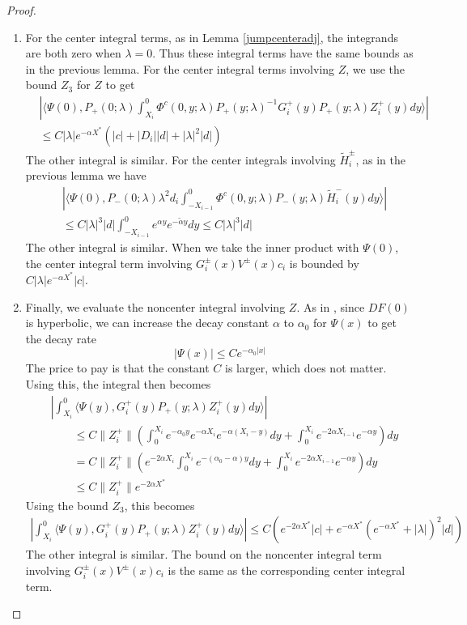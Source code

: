 \documentclass[thesis.tex]{subfiles}
\begin{document}
\begin{lemma}
\begin{proof}
\begin{enumerate}
\item For the center integral terms, as in Lemma \ref{jumpcenteradj}, the integrands are both zero when $\lambda = 0$. Thus these integral terms have the same bounds as in the previous lemma. For the center integral terms involving $Z$, we use the bound $Z_3$ for $Z$ to get
\begin{align*}
&\left| \langle \Psi(0), P_+(0; \lambda) \int_{X_i}^0 \Phi^c(0, y; \lambda) P_+(y; \lambda)^{-1} G_i^+(y) P_+(y; \lambda) Z_i^+(y) dy \rangle \right| \\
&\leq C |\lambda| e^{-\alpha X^*}\left(|c| + |D_i||d| + |\lambda|^2|d|\right)
\end{align*}
The other integral is similar. For the center integrals involving $\tilde{H}_i^\pm$, as in the previous lemma we have
\begin{align*}
&\left| \langle \Psi(0), P_-(0; \lambda) \lambda^2 d_i \int_{-X_{i-1}}^0 \Phi^c(0, y; \lambda) P_-(y; \lambda) \tilde{H}_i^-(y) dy \rangle \right| \\
&\leq C |\lambda|^3 |d| \int_{-X_{i-1}}^0 e^{\alpha y} e^{-\tilde{\alpha} y} dy \leq C |\lambda|^3 |d| 
\end{align*}
The other integral is similar. When we take the inner product with $\Psi(0)$, the center integral term involving $G_i^\pm(x) V^\pm(x) c_i$ is bounded by $C|\lambda|e^{-\alpha X^*}|c|$. 

\item Finally, we evaluate the noncenter integral involving $Z$. As in \cite[p. 448]{Sandstede1998}, since $DF(0)$ is hyperbolic, we can increase the decay constant $\alpha$ to $\alpha_0$ for $\Psi(x)$ to get the decay rate
\[
|\Psi(x)| \leq C e^{-\alpha_0 |x|}
\]
The price to pay is that the constant $C$ is larger, which does not matter. Using this, the integral then becomes
\begin{align*}
&\left| \int_{X_i}^0 \langle \Psi(y), G_i^+(y) P_+(y; \lambda) Z_i^+(y) dy \rangle \right| \\
&\qquad \leq C \| Z_i^+\|  \left( \int_0^{X_i} e^{-\alpha_0 y} e^{-\alpha X_i} e^{-\alpha(X_i - y)} dy + \int_0^{X_i} e^{-2 \alpha X_{i-1}} e^{-\alpha y} \right) dy \\
&\qquad =C \| Z_i^+\|  \left( e^{-2 \alpha X_i} \int_0^{X_i} e^{-(\alpha_0 - \alpha) y} dy + \int_0^{X_i} e^{-2 \alpha X_{i-1}} e^{-\alpha y} \right) dy \\
&\qquad \leq C \| Z_i^+\| e^{-2 \alpha X^*}
\end{align*}
Using the bound $Z_3$, this becomes
\begin{align*}
\left| \int_{X_i}^0 \langle \Psi(y), G_i^+(y) P_+(y; \lambda) Z_i^+(y) dy \rangle \right|\leq C \left( e^{-2 \alpha X^* } |c| + e^{-\alpha X^* }(e^{-\alpha X^*} + |\lambda|)^2 |d| \right)
\end{align*}
The other integral is similar. The bound on the noncenter integral term involving $G_i^\pm(x) V^\pm(x) c_i$ is the same as the corresponding center integral term.
\end{enumerate}


\end{proof}
\end{lemma}
\end{document}
